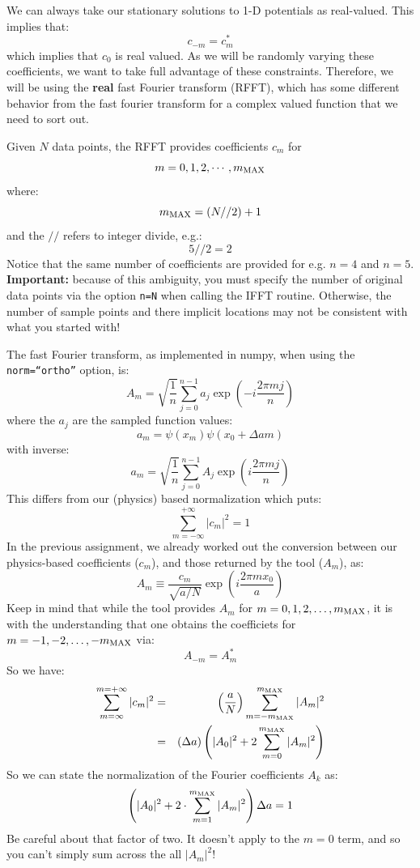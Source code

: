 \documentclass[12pt]{article}
\begin{document}
We can always take our stationary solutions to 1-D potentials as real-valued.  This implies that:
$$c_{-m} = c_{m}^*$$
which implies that $c_0$ is real valued.  As we will be randomly
varying these coefficients, we want to take full advantage of these
constraints.  Therefore, we will be using the {\bf real} fast Fourier
transform (RFFT), which has some different behavior from the fast
fourier transform for a complex valued function that we need to sort
out.

Given $N$ data points, the RFFT provides coefficients $c_m$ for
$$m = 0,1,2,\cdots,m_{\rm MAX}$$
where:
$$m_{\rm MAX} = (N//2) + 1$$
and the $//$ refers to integer divide, e.g.:
$$5 // 2 = 2$$
Notice that the same number of coefficients are provided for
e.g. $n=4$ and $n=5$. {\bf Important:} because of this ambiguity, you
must specify the number of original data points via the option {\tt n=N}
when calling the IFFT routine.  Otherwise, the number of sample points
and there implicit locations may not be consistent with what you
started with!

The fast Fourier transform, as implemented in numpy, when using the {\tt norm=``ortho''} option, is:
$$A_m = \sqrt{\frac{1}{n}} \sum_{j=0}^{n-1} a_j \exp \left( -i \frac{2 \pi m j}{n}\right)$$
where the $a_j$ are the sampled function values:
$$a_m = \psi(x_m) \psi(x_0 + \Delta a m)$$
with inverse:
$$a_m = \sqrt{\frac{1}{n}} \sum_{j=0}^{n-1} A_j \exp \left( i \frac{2 \pi m j}{n}\right)$$
This differs from our (physics) based normalization which puts:
$$\sum_{m=-\infty}^{+\infty} |c_m|^2 = 1$$
In the previous assignment, we already worked out the conversion between our
physics-based coefficients ($c_m$), and those returned by the tool
($A_m$), as:
\begin{equation}
\label{eqn:am}
A_m \equiv \frac{c_m}{\sqrt{a/N}} \exp\left(i \frac{2\pi m x_0}{a}\right)
\end{equation}
Keep in mind that while the tool provides $A_m$ for $m=0,1,2,\ldots,m_{\rm MAX}$, it is with the understanding that one obtains the coefficiets for $m=-1,-2,\ldots,-m_{\rm MAX}$ via:
$$A_{-m} = A_{m}^*$$
So we have:
\begin{eqnarray*}
  \sum_{m=\infty}^{m=+\infty} |c_m|^2
  &=& \left( \frac{a}{N} \right) \sum_{m=-m_{\rm MAX}}^{m_{\rm MAX}} |A_m|^2 \\
  &=& ( \Delta a ) \left( |A_0|^2 + 2 \sum_{m=0}^{m_{\rm MAX}} |A_m|^2 \right) \\
\end{eqnarray*}
So we can state the normalization of the Fourier coefficients $A_k$ as:
\begin{equation}
  \left(|A_0|^2 + 2 \cdot \sum_{m=1}^{m_{\rm MAX}} |A_m|^2 \right) \Delta a = 1
\end{equation}
Be careful about that factor of two.  It doesn't apply to the $m=0$
term, and so you can't simply sum across the all $|A_m|^2$!
\end{document}
